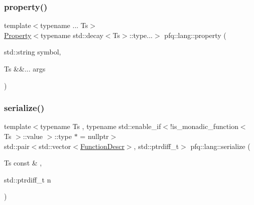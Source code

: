 \mbox{\label{namespacepfq_1_1lang_a1249450e72229273b0db707a286aea91}} 
\subsubsection{\texorpdfstring{property()}{property()}}
{\footnotesize\ttfamily template$<$typename ... Ts$>$ \\
\hyperlink{structpfq_1_1lang_1_1Property}{Property}$<$typename std\+::decay$<$Ts$>$\+::type...$>$ pfq\+::lang\+::property (\begin{DoxyParamCaption}\item[{std\+::string}]{symbol,  }\item[{Ts \&\&...}]{args }\end{DoxyParamCaption})}

\mbox{\label{namespacepfq_1_1lang_ae121f9fc8e23fbd6873d45d02e9adb81}} 
\subsubsection{\texorpdfstring{serialize()}{serialize()}\hspace{0.1cm}{\footnotesize\ttfamily [1/6]}}
{\footnotesize\ttfamily template$<$typename Ts , typename std\+::enable\+\_\+if$<$!is\+\_\+monadic\+\_\+function$<$ Ts $>$\+::value $>$\+::type $\ast$  = nullptr$>$ \\
std\+::pair$<$std\+::vector$<$\hyperlink{structpfq_1_1lang_1_1FunctionDescr}{Function\+Descr}$>$, std\+::ptrdiff\+\_\+t$>$ pfq\+::lang\+::serialize (\begin{DoxyParamCaption}\item[{Ts const \&}]{,  }\item[{std\+::ptrdiff\+\_\+t}]{n }\end{DoxyParamCaption})\hspace{0.3cm}{\ttfamily [inline]}}

\mbox{\label{namespacepfq_1_1lang_ac9dfedf649f03709f23fc7ca4afc1679}} 
